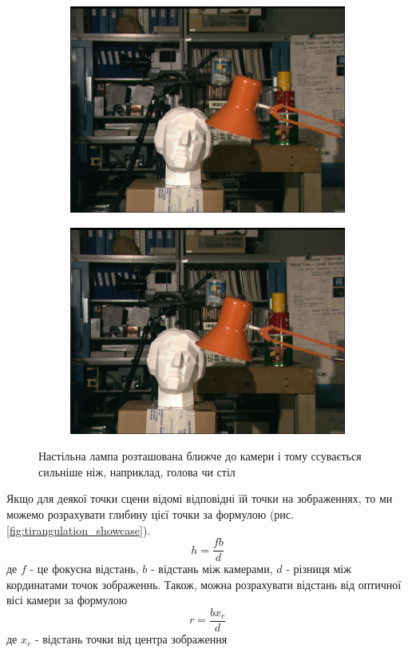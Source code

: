 \documentclass{article}
\theoremstyle{definition}
\begin{document}
\begin{figure}[h]
	\begin{subfigure}{.5\textwidth}
		\includegraphics[width=0.9\linewidth]{disparity_example_left}
		\centering
	\end{subfigure}
	\begin{subfigure}{.5\textwidth}
		\includegraphics[width=0.9\linewidth]{disparity_example_right}
		\centering
	\end{subfigure}
	\caption{Настільна лампа розташована ближче до камери і тому ссувається сильніше ніж, наприклад, голова чи стіл}
	\centering
	\label{fig:tsukuba_stereopair}
\end{figure}

Якщо для деякої точки сцени відомі відповідні їй точки на зображеннях, то ми можемо розрахувати глибину цієї точки за формулою (рис. \ref{fig:tirangulation_showcase}). 
\[ h = \frac{fb}{d} \]
де $f$ - це фокусна відстань, $b$ - відстань між камерами, $d$ - різниця між кординатами точок зображеннь. Також, можна розрахувати відстань від оптичної вісі камери за формулою
\[ r = \frac{bx_r}{d} \]
де $x_r$ - відстань точки від центра зображення
\end{document}
